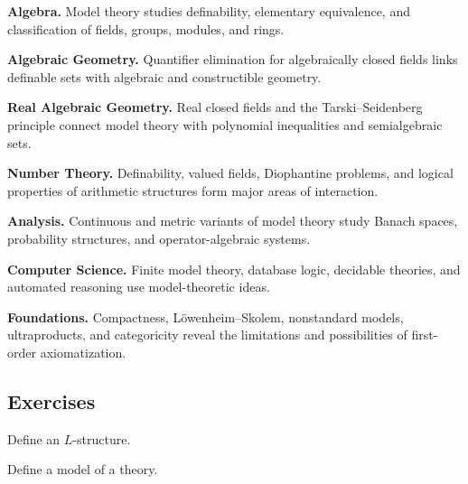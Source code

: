 \begin{applicationbox}

\textbf{Algebra.}
Model theory studies definability, elementary equivalence, and classification
of fields, groups, modules, and rings.

\medskip

\textbf{Algebraic Geometry.}
Quantifier elimination for algebraically closed fields links definable sets
with algebraic and constructible geometry.

\medskip

\textbf{Real Algebraic Geometry.}
Real closed fields and the Tarski--Seidenberg principle connect model theory
with polynomial inequalities and semialgebraic sets.

\medskip

\textbf{Number Theory.}
Definability, valued fields, Diophantine problems, and logical properties of
arithmetic structures form major areas of interaction.

\medskip

\textbf{Analysis.}
Continuous and metric variants of model theory study Banach spaces,
probability structures, and operator-algebraic systems.

\medskip

\textbf{Computer Science.}
Finite model theory, database logic, decidable theories, and automated
reasoning use model-theoretic ideas.

\medskip

\textbf{Foundations.}
Compactness, Löwenheim--Skolem, nonstandard models, ultraproducts, and
categoricity reveal the limitations and possibilities of first-order
axiomatization.

\end{applicationbox}

\subsection{Exercises}
\label{subsec:model-theory-exercises}

\begin{exercise}[1]
Define an \(L\)-structure.
\end{exercise}

\begin{exercise}[1]
Define a model of a theory.
\end{exercise}

